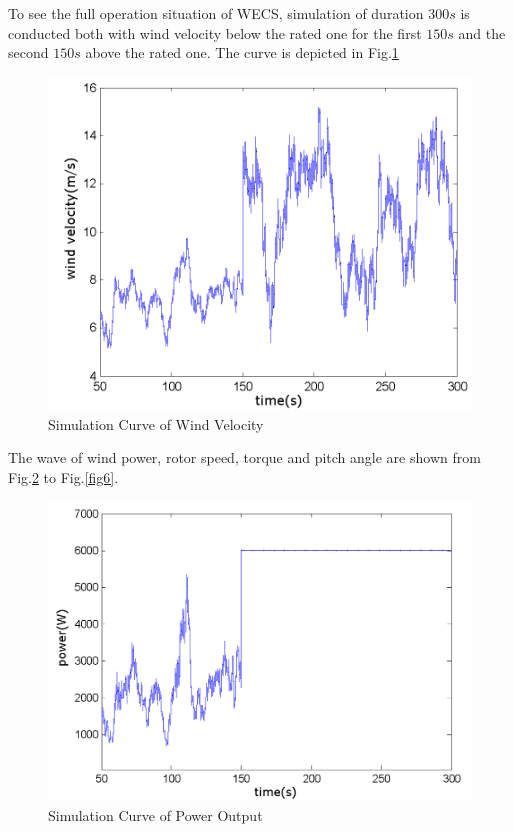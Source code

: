 \documentclass[english]{cccconf}
\begin{document}
To see the full operation situation of WECS, simulation of duration
$300s$ is conducted both with wind velocity below the rated one for
the first $150s$ and the second $150s$ above the rated one.
The curve is depicted in Fig.\ref{fig2}
\begin{figure}[!htb]
  \centering
  \includegraphics[width=\hsize]{2.png}
  \caption{Simulation Curve of Wind Velocity}
  \label{fig2}
\end{figure}

The wave of wind power, rotor speed, torque and pitch angle are shown
from Fig.\ref{fig3} to Fig.\ref{fig6}.
\begin{figure}[!htb]
  \centering
  \includegraphics[width=\hsize]{3.png}
  \caption{Simulation Curve of Power Output}
  \label{fig3}
\end{figure}
\end{document}
